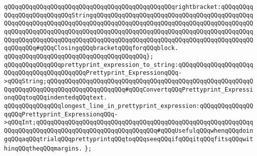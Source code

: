 \verb|qQQqqQQqqQQqqQQqqQQqqQQqqQQqqQQqqQQqqQQqqQQqqQQqrightbracket:qQQqqQQqqQQqqQQqqQQqqQQqqQQqStringqQQqqQQqqQQqqQQqqQQqqQQqqQQqqQQqqQQqqQQqqQQqqQQqqQQqqQQqqQQqqQQqqQQqqQQqqQQqqQQqqQQqqQQqqQQqqQQqqQQqqQQqqQQqqQQqqQQqqQQqqQQqqQQqqQQqqQQqqQQqqQQqqQQqqQQqqQQqqQQqqQQqqQQqqQQqqQQqqQQqqQQqqQQqqQQqqQQqqQQqqQQqqQQqqQQqqQQqqQQqqQQqqQQqqQQqqQQqqQQqqQQqqQQqqQQqqQQqqQQqqQQq#qQQqClosingqQQqbracketqQQqforqQQqblock.|\newline
\verb|qQQqqQQqqQQqqQQqqQQqqQQqqQQqqQQqqQQqqQQq};|\newline
\newline
\verb|qQQqqQQqqQQqqQQqprettyprint_expression_to_string:qQQqqQQqqQQqqQQqqQQqqQQqqQQqqQQqqQQqqQQqqQQqPrettyprint_ExpressionqQQq->qQQqString;qQQqqQQqqQQqqQQqqQQqqQQqqQQqqQQqqQQqqQQqqQQqqQQqqQQqqQQqqQQqqQQqqQQqqQQqqQQqqQQqqQQqqQQqqQQq#qQQqConvertqQQqPrettyprint_ExpressionqQQqtoqQQqindentedqQQqtext.|\newline
\verb|qQQqqQQqqQQqqQQqlongest_line_in_prettyprint_expression:qQQqqQQqqQQqqQQqqQQqPrettyprint_ExpressionqQQq->qQQqInt;qQQqqQQqqQQqqQQqqQQqqQQqqQQqqQQqqQQqqQQqqQQqqQQqqQQqqQQqqQQqqQQqqQQqqQQqqQQqqQQqqQQqqQQqqQQqqQQqqQQqqQQq#qQQqUsefulqQQqwhenqQQqdoingqQQqaqQQqtrialqQQqprettyprintqQQqtoqQQqseeqQQqifqQQqitqQQqfitsqQQqwithinqQQqtheqQQqmargins.|\newline
\verb|};|\newline

